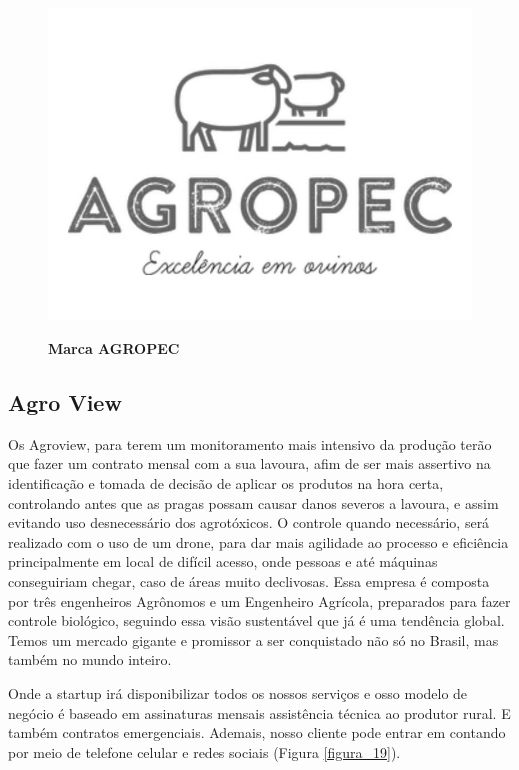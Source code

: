 \begin{figure}[H]
\centering
\caption{\textbf{Marca AGROPEC}}
\includegraphics[scale=0.2]{Imagens/agropec.jpg}
\label{figura_18}
\end{figure}

\subsection{Agro View}


Os Agroview, para terem um monitoramento mais intensivo da  produção terão que fazer um contrato mensal com a 
sua lavoura, afim de ser mais assertivo na identificação e tomada de decisão de aplicar os produtos  na hora certa, controlando antes que as pragas possam causar danos severos a lavoura, e assim  evitando uso desnecessário dos agrotóxicos. O controle quando necessário, será realizado com o uso de um drone, para dar mais agilidade ao processo e eficiência principalmente em local de difícil acesso, onde pessoas e até máquinas conseguiriam chegar, caso  de áreas muito declivosas. Essa empresa é composta por três engenheiros Agrônomos e um Engenheiro Agrícola, preparados para fazer controle biológico, seguindo  essa  visão sustentável que  já é uma tendência global. Temos um mercado gigante e promissor a ser  conquistado não só no Brasil, mas também no mundo inteiro.

Onde a startup irá disponibilizar todos os nossos serviços e  osso modelo de negócio é baseado em assinaturas mensais assistência técnica ao produtor rural. E também contratos emergenciais. Ademais, nosso cliente pode entrar em contando por meio de telefone celular e redes sociais (Figura \ref{figura_19}).


